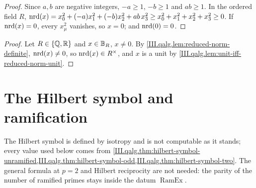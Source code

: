 \begin{lemma}
\end{lemma}
\begin{proof}
Since $a,b$ are negative integers, $-a\ge1$, $-b\ge1$ and $ab\ge1$. In the ordered field $R$,
$\operatorname{nrd}(x)=x_0^2+(-a)x_1^2+(-b)x_2^2+ab\,x_3^2\ge x_0^2+x_1^2+x_2^2+x_3^2\ge0$. If $\operatorname{nrd}(x)=0$, every $x_\mu^2$ vanishes, so $x=0$; and $\operatorname{nrd}(0)=0$.
\end{proof}

\begin{theorem}
\end{theorem}
\begin{proof}
Let $R\in\{\mathbb{Q},\mathbb{R}\}$ and $x\in\mathbb{B}_R$, $x\ne0$. By \cref{III.qalg.lem:reduced-norm-definite}, $\operatorname{nrd}(x)\ne0$, so $\operatorname{nrd}(x)\in R^\times$, and $x$ is a
unit by \cref{III.qalg.lem:unit-iff-reduced-norm-unit}.
\end{proof}

\section{The Hilbert symbol and ramification}\label{sec:qalg-hilbert}

\noindent The Hilbert symbol is defined by isotropy and is not computable as it stands; every value used below comes from
\cref{III.qalg.thm:hilbert-symbol-unramified,III.qalg.thm:hilbert-symbol-odd,III.qalg.thm:hilbert-symbol-two}. The general formula at $p=2$
and Hilbert reciprocity are not needed: the parity of the number of ramified primes stays inside the datum $\operatorname{RamEx}$.

\begin{definition}
\end{definition}


